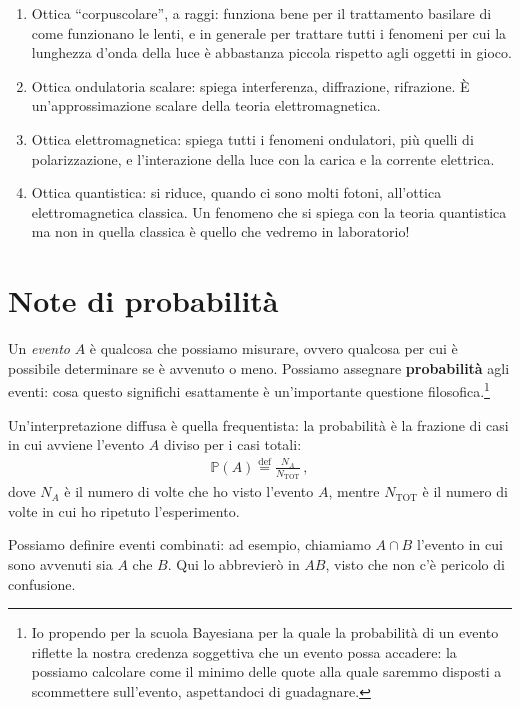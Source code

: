 \documentclass{article}
\begin{document}
\begin{enumerate}
    \item Ottica ``corpuscolare'', a raggi: funziona bene per il trattamento basilare di come funzionano le lenti, e in generale per trattare tutti i fenomeni per cui la lunghezza d'onda della luce è abbastanza piccola rispetto agli oggetti in gioco. 
    \item Ottica ondulatoria scalare: spiega interferenza, diffrazione, rifrazione. È un'approssimazione scalare della teoria elettromagnetica.
    \item Ottica elettromagnetica: spiega tutti i fenomeni ondulatori, più quelli di polarizzazione, e l'interazione della luce con la carica e la corrente elettrica.
    \item Ottica quantistica: si riduce, quando ci sono molti fotoni, all'ottica elettromagnetica classica. Un fenomeno che si spiega con la teoria quantistica ma non in quella classica è quello che vedremo in laboratorio!
\end{enumerate}

\section{Note di probabilità}

Un \emph{evento} \(A\) è qualcosa che possiamo misurare, ovvero qualcosa per cui è possibile determinare se è avvenuto o meno. 
Possiamo assegnare \textbf{probabilità} agli eventi: cosa questo significhi esattamente è un'importante questione filosofica.\footnote{Io propendo per la scuola Bayesiana per la quale la probabilità di un evento riflette la nostra credenza soggettiva che un evento possa accadere: la possiamo calcolare come il minimo delle quote alla quale saremmo disposti a scommettere sull'evento, aspettandoci di guadagnare.}

Un'interpretazione diffusa è quella frequentista: la probabilità è la frazione di casi in cui avviene l'evento \(A\) diviso per i casi totali: 
%
\begin{align}
    \mathbb{P} (A) \overset{\text{def}}{=} \frac{N_A}{N _{\text{TOT}}}
    \,,
\end{align}
%
dove \(N_A\) è il numero di volte che ho visto l'evento \(A\), mentre \(N _{\text{TOT}}\) è il numero di volte in cui ho ripetuto l'esperimento.

Possiamo definire eventi combinati: ad esempio, chiamiamo \(A\cap B\) l'evento in cui sono avvenuti sia \(A\) che \(B\).
Qui lo abbrevierò in \(AB\), visto che non c'è pericolo di confusione.
\end{document}
